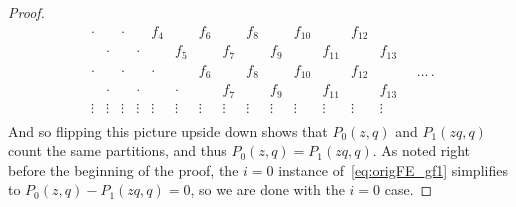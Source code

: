 \documentclass[10pt,a4paper]{amsart}
\numberwithin{equation}{section}
\theoremstyle{definition}
\begin{document}
\begin{proof}
\begin{equation*}
\begin{matrix}
\cdot &&\cdot && f_4 && f_6 && f_8 && f_{10} && f_{12} & \\
& \cdot && \cdot && f_5 && f_7 && f_9 && f_{11} && f_{13}\\
\cdot && \cdot && \cdot && f_6 && f_8 && f_{10} && f_{12} & \\
& \cdot && \cdot && \cdot && f_7 && f_9 && f_{11} && f_{13}\\
\vdots & \vdots &\vdots& \vdots &\vdots& \vdots &\vdots& \vdots &\vdots& \vdots &\vdots& \vdots&\vdots& \vdots\\ \end{matrix}\quad\dots\,.
\end{equation*}
And so flipping this picture upside down shows that $P_0(z,q)$ and $P_1(zq,q)$ count the same partitions, and thus $P_0(z,q)=P_1(zq,q)$. As noted right before the beginning of the proof, the $i=0$ instance of~\eqref{eq:origFE_gf1} simplifies to $P_0(z,q)-P_1(zq,q)=0$, so we are done with the $i=0$ case.


\end{proof}
\end{document}
